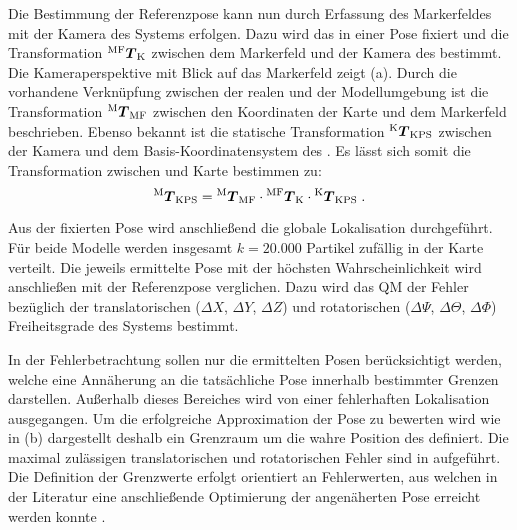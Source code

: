Die Bestimmung der Referenzpose kann nun durch Erfassung des Markerfeldes mit der Kamera des Systems erfolgen. Dazu wird das \kps{} in einer Pose fixiert und die Transformation ${^{\mathrm{MF}}\mbox{\boldmath{$T$}}_{\mathrm{K}}}$ zwischen dem Markerfeld und der Kamera des  bestimmt. Die Kameraperspektive mit Blick auf das Markerfeld zeigt  (a). Durch die vorhandene Verknüpfung zwischen der realen und der Modellumgebung ist die Transformation ${^{\mathrm{M}}\mbox{\boldmath{$T$}}_{\mathrm{MF}}}$ zwischen den Koordinaten der Karte und dem Markerfeld beschrieben. Ebenso bekannt ist die statische Transformation ${^{\mathrm{K}}\mbox{\boldmath{$T$}}_{\mathrm{KPS}}}$ zwischen der Kamera und dem Basis-Koordinatensystem des . Es lässt sich somit die Transformation zwischen \kps{} und Karte bestimmen zu:
%
%
\begin{equation}
{^{\mathrm{M}}\mbox{\boldmath{$T$}}_{\mathrm{KPS}}} = {^{\mathrm{M}}\mbox{\boldmath{$T$}}_{\mathrm{MF}}} \cdot {^{\mathrm{MF}}\mbox{\boldmath{$T$}}_{\mathrm{K}}} \cdot {^{\mathrm{K}}\mbox{\boldmath{$T$}}_{\mathrm{KPS}}} \; \text{.}
\end{equation}

Aus der fixierten Pose wird anschließend die globale Lokalisation durchgeführt. Für beide Modelle werden insgesamt $k=20.000$ Partikel zufällig in der Karte verteilt. Die jeweils ermittelte Pose mit der höchsten Wahrscheinlichkeit wird anschließen mit der Referenzpose verglichen. Dazu wird das QM der Fehler bezüglich der translatorischen ($\Delta X$, $\Delta Y$, $\Delta Z$) und rotatorischen ($\Delta \Psi$, $\Delta \Theta$, $\Delta \Phi$) Freiheitsgrade des Systems bestimmt.\\



In der Fehlerbetrachtung sollen nur die ermittelten Posen berücksichtigt werden, welche eine Annäherung an die tatsächliche Pose innerhalb bestimmter Grenzen darstellen. Außerhalb dieses Bereiches wird von einer fehlerhaften Lokalisation ausgegangen. Um die erfolgreiche Approximation der Pose zu bewerten wird wie in  (b) dargestellt deshalb ein Grenzraum um die wahre Position des  definiert. Die maximal zulässigen translatorischen und rotatorischen Fehler sind in  aufgeführt. Die Definition der Grenzwerte erfolgt orientiert an Fehlerwerten, aus welchen in der Literatur eine anschließende Optimierung der angenäherten Pose erreicht werden konnte \cite{Forster2013}.\\

